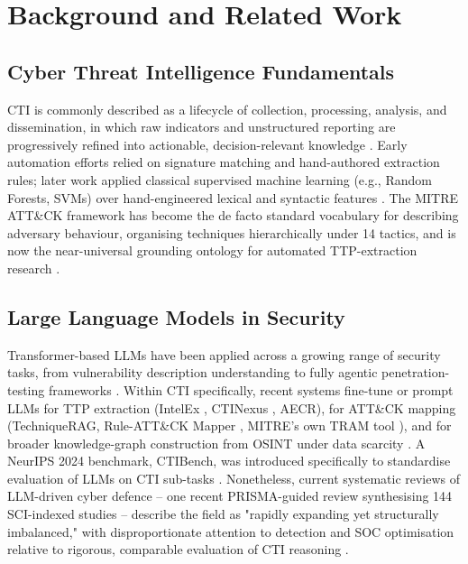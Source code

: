 \documentclass[runningheads]{llncs}
\begin{document}
\section{Background and Related Work}
\label{sec:background}

\subsection{Cyber Threat Intelligence Fundamentals}

CTI is commonly described as a lifecycle of collection, processing, analysis, and dissemination, in which raw indicators and unstructured reporting are progressively refined into actionable, decision-relevant knowledge \cite{rahmansurvey2023}. Early automation efforts relied on signature matching and hand-authored extraction rules; later work applied classical supervised machine learning (e.g., Random Forests, SVMs) over hand-engineered lexical and syntactic features \cite{rahman2022}. The MITRE ATT\&CK framework has become the de facto standard vocabulary for describing adversary behaviour, organising techniques hierarchically under 14 tactics, and is now the near-universal grounding ontology for automated TTP-extraction research \cite{mitreattacksota2023}.

\subsection{Large Language Models in Security}

Transformer-based LLMs have been applied across a growing range of security tasks, from vulnerability description understanding to fully agentic penetration-testing frameworks \cite{pentestcomparison2025}. Within CTI specifically, recent systems fine-tune or prompt LLMs for TTP extraction (IntelEx \cite{intelex2024}, CTINexus \cite{ctinexus2024}, AECR), for ATT\&CK mapping (TechniqueRAG, Rule-ATT\&CK Mapper \cite{ruleattackmapper2025}, MITRE's own TRAM tool \cite{tramtool}), and for broader knowledge-graph construction from OSINT under data scarcity \cite{ctinexus2024}. A NeurIPS 2024 benchmark, CTIBench, was introduced specifically to standardise evaluation of LLMs on CTI sub-tasks \cite{ctibench2024}. Nonetheless, current systematic reviews of LLM-driven cyber defence -- one recent PRISMA-guided review synthesising 144 SCI-indexed studies -- describe the field as "rapidly expanding yet structurally imbalanced," with disproportionate attention to detection and SOC optimisation relative to rigorous, comparable evaluation of CTI reasoning \cite{secureautonomous2026}.
\end{document}
